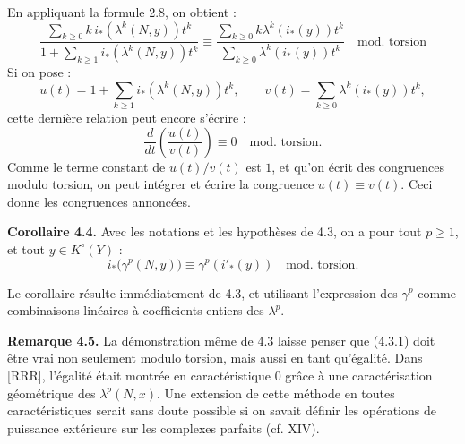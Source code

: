 En
appliquant la formule 2.8, on obtient :
\[
  \frac{\sum_{k\ge0}k\,i_*(\lambda^k(N,y))t^k}
       {1+\sum_{k\ge1} i_*(\lambda^k(N,y))t^k}
  \equiv
  \frac{\sum_{k\ge0}k\lambda^k(i_*(y))t^k}
       {\sum_{k\ge0}\lambda^k(i_*(y))t^k}
       \quad\text{mod.\ torsion}
\]
Si on pose :
\[
  u(t)=1+\sum_{k\ge1}i_*(\lambda^k(N,y))t^k,\qquad
  v(t)=\sum_{k\ge0}\lambda^k(i_*(y))t^k,
\]
cette dernière relation peut encore s'écrire :
\[
  \frac{d}{dt}\!\left(\frac{u(t)}{v(t)}\right)\equiv0
  \quad\text{mod.\ torsion}.
\]
Comme le terme constant de \(u(t)/v(t)\) est \(1\), et qu'on écrit des congruences modulo torsion, on peut intégrer et écrire la congruence \(u(t)\equiv v(t)\). Ceci donne les congruences annoncées.

\textbf{Corollaire 4.4.} Avec les notations et les hypothèses de 4.3, on a pour tout \(p\ge1\), et tout \(y\in K^\circ(Y)\) :
\[
  i_*\bigl(\gamma^p(N,y)\bigr)\equiv \gamma^p(i'_*(y))
  \quad\text{mod.\ torsion}.
\]

Le corollaire résulte immédiatement de 4.3, et utilisant l'expression des \(\gamma^p\) comme combinaisons linéaires à coefficients entiers des \(\lambda^p\).

\textbf{Remarque 4.5.} La démonstration même de 4.3 laisse penser que (4.3.1) doit être vrai non seulement modulo torsion, mais aussi en tant qu'égalité. Dans [RRR], l'égalité était montrée en caractéristique \(0\) grâce à une caractérisation géométrique des \(\lambda^p(N,x)\). Une extension de cette méthode en toutes caractéristiques serait sans doute possible si on savait définir les opérations de puissance extérieure sur les complexes parfaits (cf. XIV).

